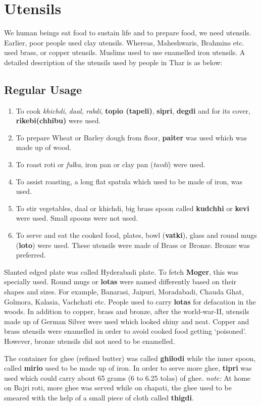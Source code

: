 \section{Utensils}
We human beings eat food to sustain life and to prepare food, we need utensils.
Earlier, poor people used clay utensils. Whereas, Maheshwaris, Brahmins etc.
used brass, or copper utensils. Muslims used to use enamelled iron utensils.
A detailed description of the utensils used by people in Thar is as below:
\subsection{Regular Usage}
\begin{enumerate}
\item To cook \textit{khichdi}, \textit{daal}, \textit{rabdi}, \textbf{topio
(tapeli)}, \textbf{sipri}, \textbf{degdi} and for its cover,
\textbf{rikebi(chhibu)} were used.
\item To prepare Wheat or Barley dough from floor, \textbf{paiter} was used
which was made up of wood.
\item To roast roti or \textit{fulka}, iron pan or clay pan (\textit{tavdi})
were used.
\item To assist roasting, a long flat spatula which used to be made of iron, was
used.
\item To stir vegetables, daal or khichdi, big brass spoon called \textbf{kudchhi} or
\textbf{kevi} were used. Small spoons were not used.
\item To serve and eat the cooked food, plates, bowl (\textbf{vatki}), glass and
round mugs (\textbf{loto}) were used. These utensils were made of Brass or
Bronze. Bronze was preferred.
\end{enumerate}
Slanted edged plate was called Hyderabadi plate. To fetch \textbf{Moger}, this
was specially used. Round mugs or \textbf{lotas} were named differently based on
their shapes and sizes. For example, Banarasi, Jaipuri, Moradabadi, Chauda Ghat,
Golmora, Kalasia, Vachchati etc.
People used to carry \textbf{lotas} for defacation in the woods.
In addition to copper, brass and bronze, after the world-war-II, utensils made
up of German Silver were used which looked shiny and neat. Copper and brass
utensils were enamelled in order to avoid cooked food getting `poisoned'.
However, bronze utensils did not need to be enamelled.

The container for ghee (refined butter) was called \textbf{ghilodi} while the
inner spoon, called \textbf{mirio} used to be made up of iron. In order to serve
more ghee, \textbf{tipri} was used which could carry about 65 grams (6 to 6.25
tolas) of ghee. \emph{note:} At home on Bajri roti, more ghee was served while
on chapati, the ghee used to be smeared with the help of a small piece of cloth
called \textbf{thigdi}.

